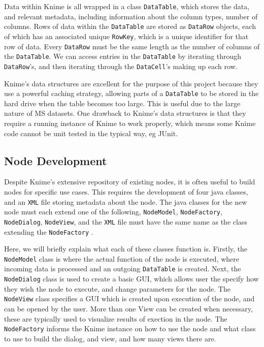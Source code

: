 \documentclass[11pt,openany]{book}
\begin{document}
Data within Knime is all wrapped in a class \texttt{DataTable}, which stores the data, and relevant metadata, including information about the column types, number of columns. Rows of data within the \texttt{DataTable} are stored as \texttt{DataRow} objects, each of which has an associated unique \texttt{RowKey}, which is a unique identifier for that row of data. Every \texttt{DataRow} must be the same length as the number of columns of the \texttt{DataTable}. We can access entries in the \texttt{DataTable} by iterating through \texttt{DataRow}'s, and then iterating through the \texttt{DataCell}'s making up each row. 

Knime's data structures are excellent for the purpose of this project because they use a powerful caching strategy, allowing parts of a \texttt{DataTable} to be stored in the hard drive when the table becomes too large\cite{KNIME_Basic_info}. This is useful due to the large nature of MS datasets. One drawback to Knime's data structures is that they require a running instance of Knime to work properly, which means some Knime code cannot be unit tested in the typical way, eg JUnit. 

\subsection{Node Development}
Despite Knime's extensive repository of existing nodes, it is often useful to build nodes for specific use cases. This requires the development of four java classes, and an \texttt{XML} file storing metadata about the node. The java classes for the new node must each extend one of the following, \texttt{NodeModel}, \texttt{NodeFactory}, \texttt{NodeDialog}, \texttt{NodeView}, and the \texttt{XML} file must have the same name as the class extending the \texttt{NodeFactory} \cite{KNIME_Basic_info}.

Here, we will briefly explain what each of these classes function is. Firstly, the \texttt{NodeModel} class is where the actual function of the node is executed, where incoming data is processed and an outgoing \texttt{DataTable} is created. Next, the \texttt{NodeDialog} class is used to create a basic GUI, which allows user the specify how they wish the node to execute, and change parameters for the node. The \texttt{NodeView} class specifies a GUI which is created upon execution of the node, and can be opened by the user. More than one View can be created when necessary, these are typically used to visualize results of exection in the node. The \texttt{NodeFactory} informs the Knime instance on how to use the node and what class to use to build the dialog, and view, and how many views there are.
\end{document}
